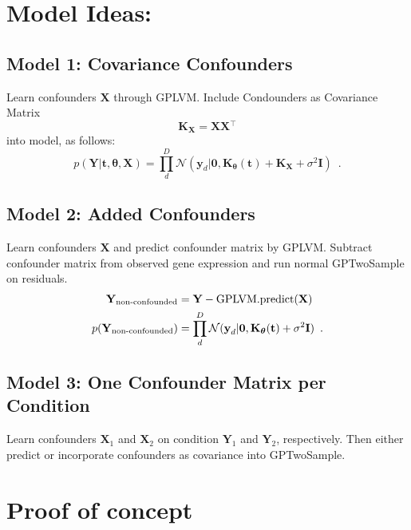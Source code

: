 \documentclass[a4paper,tablecaptionabove]{article}
\newcommand{\matr}[1]{\ensuremath{\boldsymbol{\mathbf #1}}}
\newcommand{\T}{\ensuremath{^\top}}
\begin{document}
\section{Model Ideas:}
\label{sec:model-ideas}

\subsection{Model 1: Covariance Confounders}
\label{sec:model-1:-covariance}

Learn confounders $\matr{X}$ through GPLVM. Include Condounders as
Covariance Matrix
\begin{equation}
  \label{eq:1}
  \matr K_{\matr X} = \matr X\matr X\T
\end{equation}
into model, as follows:
\begin{equation}
  \label{eq:2}
  p(\matr Y|\matr t,\matr \theta,\matr X) = \prod_d^D\mathcal N(\matr y_d|\matr 0, \matr K_{\matr\theta}(\matr t) + \matr K_{\matr X}+\sigma^2\matr I)\enspace.
\end{equation}

\subsection{Model 2: Added Confounders}
\label{sec:model-2:-added}

Learn confounders $\matr X$ and predict confounder matrix by
GPLVM. Subtract confounder matrix from observed gene expression and
run normal GPTwoSample on residuals.
\begin{align}
  \label{eq:3}
  \matr Y_{\text{non-confounded}} &= \matr Y - \text{GPLVM.predict(\matr X)}\\
  p(\matr Y_{\text{non-confounded}}) &= \prod_d^D\mathcal N(\matr
  y_d|\matr 0, \matr K_{\matr\theta}(\matr t) + \sigma^2\matr
  I)\enspace.
\end{align}

\subsection{Model 3: One Confounder Matrix per Condition}
\label{sec:model-3:-one}

Learn confounders $\matr X_1$ and $\matr X_2$ on condition $\matr Y_1$
and $\matr Y_2$, respectively. Then either predict or incorporate
confounders as covariance into GPTwoSample.

\section{Proof of concept}
\label{sec:proof-concept}
\end{document}
